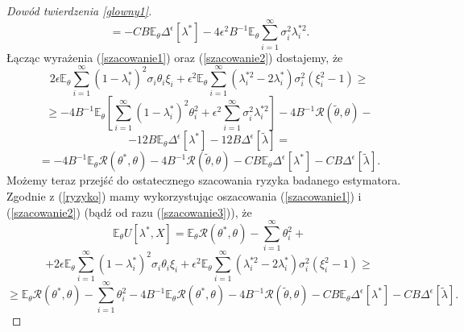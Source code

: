 \documentclass{article}
\begin{document}
\begin{proof}[Dowód twierdzenia \ref{glowny1}]
\begin{displaymath}
\end{displaymath}
\begin{equation}\label{szacowanie2}
=-CB\mathbb{E}_{\theta}\Delta^{\epsilon}[\lambda^*]-4\epsilon^2B^{-1}\mathbb{E}_{\theta}\sum_{i=1}^{\infty}\sigma_i^2\lambda_i^{*2}.
\end{equation}
Łącząc wyrażenia (\ref{szacowanie1}) oraz (\ref{szacowanie2}) dostajemy, że
\begin{displaymath}
2\epsilon\mathbb{E}_{\theta}\sum_{i=1}^{\infty}(1-\lambda_i^*)^2\sigma_i\theta_i\xi_i+\epsilon^2\mathbb{E}_{\theta}\sum_{i=1}^{\infty}(\lambda_i^{*2}-2\lambda_i^*)\sigma_i^2(\xi_i^2-1)\geq
\end{displaymath}
\begin{displaymath}
\geq -4B^{-1}\mathbb{E}_{\theta}\left[\sum_{i=1}^{\infty}(1-\lambda_i^*)^2\theta_i^2+\epsilon^2\sum_{i=1}^{\infty}\sigma_i^2\lambda_i^{*2}\right]-4B^{-1}\mathcal{R}(\tilde{\theta},\theta)-
\end{displaymath}
\begin{displaymath}
-12B\mathbb{E}_{\theta}\Delta^{\epsilon}[\lambda^*]-12B\Delta^{\epsilon}[\tilde{\lambda}]=
\end{displaymath}
\begin{equation}\label{szacowanie3}
=-4B^{-1}\mathbb{E}_{\theta}\mathcal{R}(\theta^*,\theta)-4B^{-1}\mathcal{R}(\tilde{\theta},\theta)-CB\mathbb{E}_{\theta}\Delta^{\epsilon}[\lambda^*]-CB\Delta^{\epsilon}[\tilde{\lambda}].
\end{equation}
Możemy teraz przejść do ostatecznego szacowania ryzyka badanego estymatora. Zgodnie z (\ref{ryzyko}) mamy wykorzystując oszacowania (\ref{szacowanie1}) i (\ref{szacowanie2}) (bądź od razu (\ref{szacowanie3})), że
\begin{displaymath}
\mathbb{E}_{\theta}U[\lambda^*,X]=\mathbb{E}_{\theta}\mathcal{R}(\theta^*,\theta)-\sum_{i=1}^{\infty}\theta_i^2+
\end{displaymath}
\begin{displaymath}
+2\epsilon\mathbb{E}_{\theta}\sum_{i=1}^{\infty}(1-\lambda_i^*)^2\sigma_i\theta_i\xi_i+\epsilon^2\mathbb{E}_{\theta}\sum_{i=1}^{\infty}(\lambda_i^{*2}-2\lambda_i^*)\sigma_i^2(\xi_i^2-1)\geq
\end{displaymath}
\begin{displaymath}
\geq \mathbb{E}_{\theta}\mathcal{R}(\theta^*,\theta)-\sum_{i=1}^{\infty}\theta_i^2-4B^{-1}\mathbb{E}_{\theta}\mathcal{R}(\theta^*,\theta)-4B^{-1}\mathcal{R}(\tilde{\theta},\theta)-CB\mathbb{E}_{\theta}\Delta^{\epsilon}[\lambda^*]-CB\Delta^{\epsilon}[\tilde{\lambda}].

\end{displaymath}
\end{proof}
\end{document}
